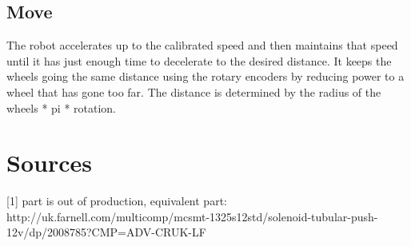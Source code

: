 \documentclass[a4paper]{article}
\begin{document}
\subsection{Move}
The robot accelerates up to the calibrated speed and then maintains that speed until it has just enough time to decelerate to the desired distance. It keeps the wheels going the same distance using the rotary encoders by reducing power to a wheel that has gone too far. The distance is determined by the radius of the wheels * pi * rotation. 
\section{Sources}
[1] part is out of production, equivalent part: http://uk.farnell.com/multicomp/mcsmt-1325s12std/solenoid-tubular-push-12v/dp/2008785?CMP=ADV-CRUK-LF
\end{document}
